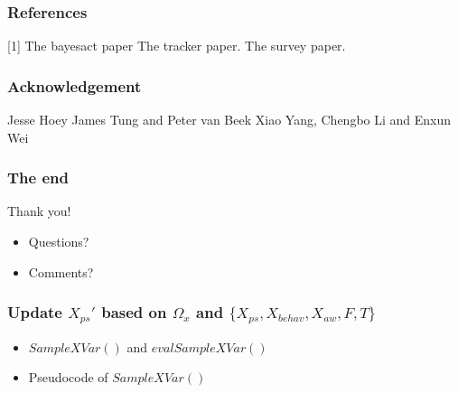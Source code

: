 \documentclass{beamer}
\begin{document}
\begin{frame}
\frametitle{References}
[1] The bayesact paper
\newline [2] The tracker paper.
\newline [3] The survey paper.
\end{frame}
\begin{frame}
\frametitle{Acknowledgement}
Jesse Hoey
\newline James Tung and Peter van Beek
\newline Xiao Yang, Chengbo Li and Enxun Wei
\end{frame}
\begin{frame}
\frametitle{The end}
\Huge{\centerline{Thank you!}}   
\fontsize{5mm}{4mm}
\begin{itemize}
\item Questions?
\item Comments?
\end{itemize}
\end{frame}


\begin{frame}
\frametitle{Update $X_{ps}'$ based on $\Omega_{x}$ and $\{X_{ps}, X_{behav}, X_{aw}, F, T\}$}
\begin{itemize}
\item $SampleXVar()$ and $evalSampleXVar()$
\item Pseudocode of $SampleXVar()$
\end{itemize}
\end{frame}
\end{document}
